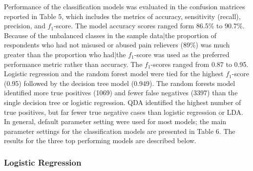 \documentclass[sigconf]{acmart}
\begin{document}
Performance of the classification models was evaluated in the confusion 
matrices reported in Table 5, which includes the metrics of accuracy, 
sensitivity (recall), precision, and $f_1$-score. The model accuracy 
scores ranged form 86.5\% to 90.7\%. Because of the unbalanced classes in 
the sample data|the proportion of respondents who had not misused or abused 
pain relievers (89\%) was much greater than the proportion who had|the 
$f_1$-score was used as the preferred performance metric rather than 
accuracy. The $f_1$-scores ranged from 0.87 to 0.95. Logistic regression 
and the random forest model were tied for the highest $f_1$-score (0.95) 
followed by the decision tree model (0.949). The random forests model 
identified more true positives (1069) and fewer false negatives (3397) 
than the single decision tree or logistic regression. QDA identified 
the highest number of true positives, but far fewer true negative cases
than logistic regression or LDA. In general, default parameter setting 
were used for most models; the main parameter settings for the 
classification models are presented in Table 6. The results for the 
three top performing models are described below.  


\subsubsection{Logistic Regression}
\end{document}
